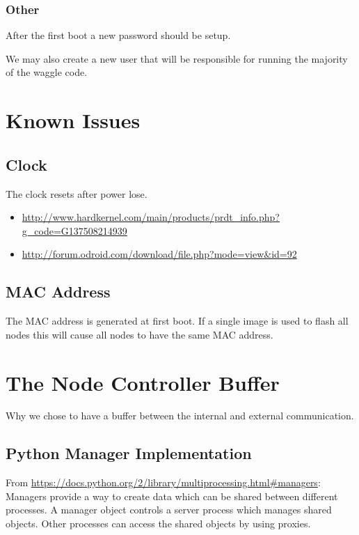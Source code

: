 \subsubsection{Other}

After the first boot a new password should be setup.

We may also create a new user that will be responsible for running the majority of the waggle code.

\section{Known Issues}

\subsection{Clock}

The clock resets after power lose.
\begin{itemize}
 \item \url{http://www.hardkernel.com/main/products/prdt_info.php?g_code=G137508214939}
 \item \url{http://forum.odroid.com/download/file.php?mode=view&id=92}
\end{itemize}

\subsection{MAC Address}

The MAC address is generated at first boot. If a single image is used to flash all nodes this will cause all nodes to have the same MAC address.


\section{The Node Controller Buffer}

Why we chose to have a buffer between the internal and external communication.

\subsection{Python Manager Implementation}

From \url{https://docs.python.org/2/library/multiprocessing.html#managers}: Managers provide a way to create data which can be shared between different processes. A manager object controls a server process which manages shared objects. Other processes can access the shared objects by using proxies.

